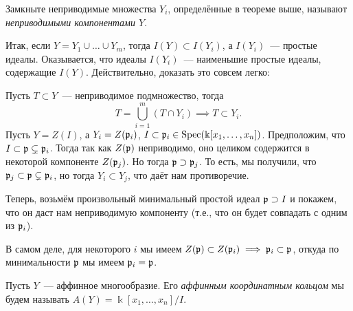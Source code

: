 	\begin{definition} 
		Замкныте неприводимые множества $Y_i$, определённые в теореме выше, называют \emph{неприводимыми компонентами $Y$}.
	\end{definition}

	Итак, если $Y = Y_1 \cup \ldots \cup Y_m$, тогда $I(Y) \subset I(Y_i)$, а $I(Y_i)$~--- простые идеалы. Оказывается, что идеалы $I(Y_i)$~--- наименьшие простые идеалы, содержащие $I(Y)$. Действительно, доказать это совсем легко: 

	Пусть $T \subset Y$~--- неприводимое подмножество, тогда
	\[
		T = \bigcup_{i = 1}^{m}(T \cap Y_i) \implies T \subset Y_i.
	\]
	Пусть $Y = Z(I)$, а $Y_i = Z(\mathfrak{p}_i)$, $I \subset \mathfrak{p}_i \in \operatorname{Spec}(\Bbbk[x_1, \ldots, x_n])$. Предположим, что $I \subset \mathfrak{p} \subsetneq \mathfrak{p}_i$. Тогда так как $Z(\mathfrak{p})$ неприводимо, оно целиком содержится в некоторой компоненте $Z(\mathfrak{p}_j)$. Но тогда $\mathfrak{p} \supset \mathfrak{p}_j$. То есть, мы получили, что $\mathfrak{p}_j \subset \mathfrak{p} \subsetneq \mathfrak{p}_i$, но тогда $Y_i \subset Y_j$, что даёт нам противоречие. 

	Теперь, возьмём произвольный минимальный простой идеал $\mathfrak{p} \supset I$ и покажем, что он даст нам неприводимую компоненту (т.е., что он будет совпадать с одним из $\mathfrak{p}_i$). 

	В самом деле, для некоторого $i$ мы имеем $Z(\mathfrak{p}) \subset Z(\mathfrak{p}_i) \implies \mathfrak{p}_i \subset \mathfrak{p}$, откуда по минимальности $\mathfrak{p}$ мы имеем $\mathfrak{p}_i = \mathfrak{p}$.

	\begin{definition} 
		Пусть $Y$~--- аффинное многообразие. Его \emph{аффинным координатным кольцом} мы будем называть $A(Y) = \Bbbk[x_1, \ldots, x_n]/I$.
	\end{definition}




		
	



	